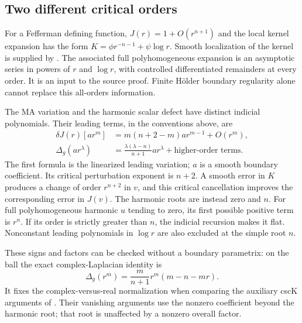 \subsection{Two different critical orders}
\label{sec:appH-Bergman-indicial}

For a Fefferman defining function, $J(r)=1+O(r^{n+1})$ and
the local kernel expansion has the form
$K=\phi r^{-n-1}+\psi\log r$. Smooth localization of the kernel
is supplied by \cite[Theorem~1.1]{HsiaoHuangLi26LocalizationV2}.
The associated full polyhomogeneous expansion is an asymptotic
series in powers of $r$ and $\log r$, with controlled differentiated
remainders at every order. It is an input to the source proof. Finite H\"older boundary regularity
alone cannot replace this all-orders information.

The MA variation and the harmonic scalar defect have distinct
indicial polynomials. Their leading terms, in the conventions above,
are
\begin{equation*}
 \begin{aligned}
 \delta J(r)[a r^m]&=m(n+2-m)a r^{m-1}+O(r^m),\\
 \Delta_g(a r^\lambda)&=
       \frac{\lambda(\lambda-n)}{n+1}a r^\lambda
       +\text{higher-order terms}.
 \end{aligned}
 \tag{H.36}\label{eq:appH-Bergman-indicial}
\end{equation*}
The first formula is the linearized leading variation; $a$ is
a smooth boundary coefficient. Its critical perturbation exponent
is $n+2$. A smooth error in $K$ produces a change of order
$r^{n+2}$ in $v$, and this critical cancellation improves the
corresponding error in $J(v)$. The harmonic roots are instead
zero and $n$. For full polyhomogeneous harmonic $u$ tending to
zero, its first possible positive term is $r^n$. If its order
is strictly greater than $n$, the indicial recursion makes it flat.
Nonconstant leading polynomials in $\log r$ are also excluded
at the simple root $n$.

These signs and factors can be checked without a boundary
parametrix: on the ball the exact complex-Laplacian identity is
\begin{equation*}
 \Delta_g(r^m)=\frac{m}{n+1}r^m(m-n-mr).
 \tag{H.37}\label{eq:appH-Bergman-ball-Laplacian}
\end{equation*}
It fixes the complex-versus-real normalization when comparing
the auxiliary cscK arguments of
\cite{HsiaoHuangLi26LocalizationV2,LiLiu26CSCBergmanV1}.
Their vanishing arguments use the nonzero coefficient beyond the
harmonic root; that root is unaffected by a nonzero overall factor.

